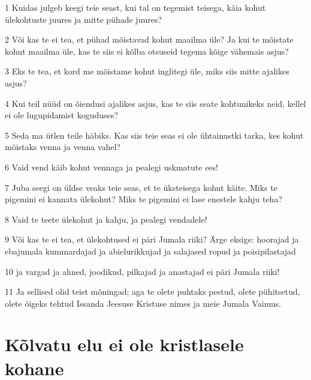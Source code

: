 \par 1 Kuidas julgeb keegi teie seast, kui tal on tegemist teisega, käia kohut ülekohtuste juures ja mitte pühade juures?
\par 2 Või kas te ei tea, et pühad mõistavad kohut maailma üle? Ja kui te mõistate kohut maailma üle, kas te siis ei kõlba otsuseid tegema kõige vähemais asjus?
\par 3 Eks te tea, et kord me mõistame kohut inglitegi üle, miks siis mitte ajalikes asjus?
\par 4 Kui teil nüüd on õiendusi ajalikes asjus, kas te siis seate kohtunikeks neid, kellel ei ole lugupidamist koguduses?
\par 5 Seda ma ütlen teile häbiks. Kas siis teie seas ei ole ühtainustki tarka, kes kohut mõistaks venna ja venna vahel?
\par 6 Vaid vend käib kohut vennaga ja pealegi uskmatute ees!
\par 7 Juba seegi on üldse veaks teie seas, et te üksteisega kohut käite. Miks te pigemini ei kannata ülekohut? Miks te pigemini ei lase enestele kahju teha?
\par 8 Vaid te teete ülekohut ja kahju, ja pealegi vendadele!
\par 9 Või kas te ei tea, et ülekohtused ei päri Jumala riiki? Ärge eksige: hoorajad ja ebajumala kummardajad ja abielurikkujad ja salajased ropud ja poisipilastajad
\par 10 ja vargad ja ahned, joodikud, pilkajad ja anastajad ei päri Jumala riiki!
\par 11 Ja sellised olid teist mõningad; aga te olete puhtaks pestud, olete pühitsetud, olete õigeks tehtud Issanda Jeesuse Kristuse nimes ja meie Jumala Vaimus.

\section*{Kõlvatu elu ei ole kristlasele kohane}

